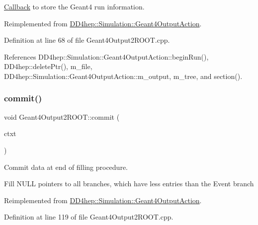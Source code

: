 \hyperlink{class_d_d4hep_1_1_callback}{Callback} to store the Geant4 run information. 



Reimplemented from \hyperlink{class_d_d4hep_1_1_simulation_1_1_geant4_output_action_afc8b13d72433d8f917555e952e1ce528}{D\+D4hep\+::\+Simulation\+::\+Geant4\+Output\+Action}.



Definition at line 68 of file Geant4\+Output2\+R\+O\+O\+T.\+cpp.



References D\+D4hep\+::\+Simulation\+::\+Geant4\+Output\+Action\+::begin\+Run(), D\+D4hep\+::delete\+Ptr(), m\+\_\+file, D\+D4hep\+::\+Simulation\+::\+Geant4\+Output\+Action\+::m\+\_\+output, m\+\_\+tree, and section().

\hypertarget{class_d_d4hep_1_1_simulation_1_1_geant4_output2_r_o_o_t_a06090a17c7d266dcdfb7b2b180aeaffe}{}\label{class_d_d4hep_1_1_simulation_1_1_geant4_output2_r_o_o_t_a06090a17c7d266dcdfb7b2b180aeaffe} 
\subsubsection{\texorpdfstring{commit()}{commit()}}
{\footnotesize\ttfamily void Geant4\+Output2\+R\+O\+O\+T\+::commit (\begin{DoxyParamCaption}\item[{\hyperlink{class_d_d4hep_1_1_simulation_1_1_geant4_output_action_1_1_output_context}{Output\+Context}$<$ G4\+Event $>$ \&}]{ctxt }\end{DoxyParamCaption})\hspace{0.3cm}{\ttfamily [virtual]}}



Commit data at end of filling procedure. 

Fill N\+U\+LL pointers to all branches, which have less entries than the Event branch 

Reimplemented from \hyperlink{class_d_d4hep_1_1_simulation_1_1_geant4_output_action_a1d83299b79de6a1a75e70ef5a9e4d3eb}{D\+D4hep\+::\+Simulation\+::\+Geant4\+Output\+Action}.



Definition at line 119 of file Geant4\+Output2\+R\+O\+O\+T.\+cpp.



